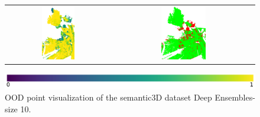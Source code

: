 \begin{figure}[h!]
\begin{tabular}{cc}
            \includegraphics[width=0.33\textwidth, height=0.18\textheight]{images/ood_imgs/de_sem3d/de_prob_10_3.pdf}& 
            \includegraphics[width=0.33\textwidth, height=0.18\textheight]{images/ood_imgs/de_sem3d/de_ood_auroc_3.pdf}\\
        \end{tabular}
        \includegraphics[scale=0.45]{images/prob_legend.pdf}
        \caption{OOD point visualization of the semantic3D dataset Deep Ensembles-size 10.}
        \label{fig:de_ood_auroc_sem3d_prob}
    \end{figure}
